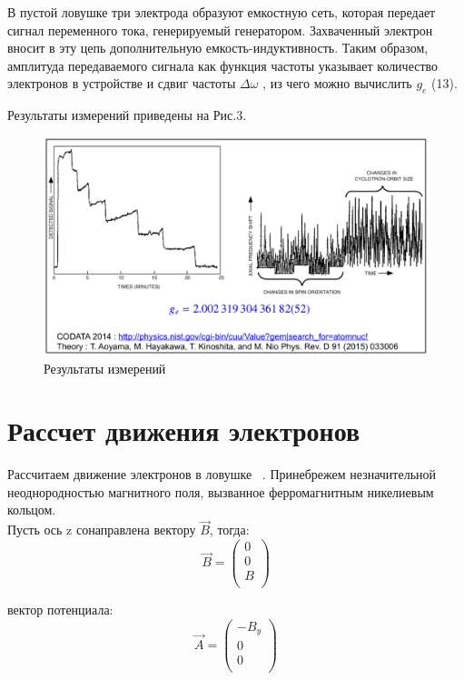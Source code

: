 \documentclass[11pt]{article}
\begin{document}
В пустой ловушке три электрода образуют емкостную сеть, которая передает сигнал переменного тока, генерируемый генератором. Захваченный электрон вносит в эту цепь дополнительную емкость-индуктивность. Таким образом, амплитуда передаваемого сигнала как функция частоты указывает количество электронов в устройстве и сдвиг частоты $\Delta \omega$ , из чего можно вычислить $g_e$ (13).

Результаты измерений приведены на Рис.3. \\
\begin{figure}[htp]
\centering
\includegraphics[scale=0.3]{penn_3.png}
\caption{Результаты измерений ~\cite{Courcera_NPh,Mart}}
\label{}
\end{figure}


\section{Рассчет движения электронов}
Рассчитаем движение электронов в ловушке ~\cite{Courcera_NPh}. Принебрежем незначительной неоднородностью магнитного поля, вызванное ферромагнитным никелиевым кольцом. \\

Пусть ось z сонаправлена вектору $\vec B$, тогда:
\begin{equation}
\vec B = \left(
\begin{array}{c}
0\\
0\\
B\\
\end{array}
\right)
\end{equation}

вектор потенциала:
\begin{equation}
\vec A = \left(
\begin{array}{c}
-B_y\\
0\\
0\\
\end{array}
\right)
\end{equation}
\end{document}
